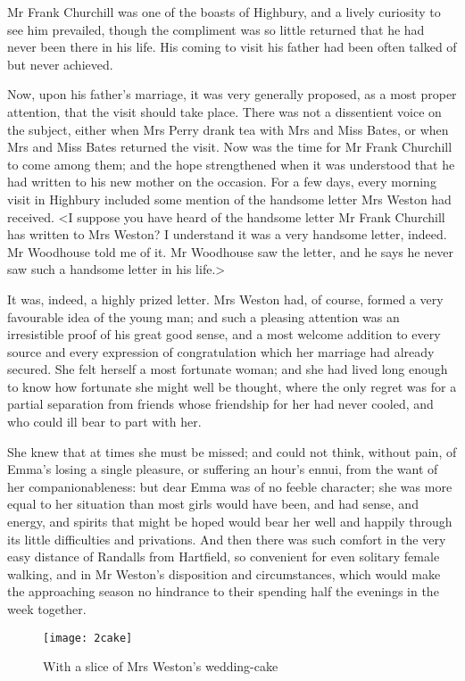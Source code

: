 Mr Frank Churchill was one of the boasts of Highbury, and a lively curiosity to see him prevailed, though the compliment was so little returned that he had never been there in his life. His coming to visit his father had been often talked of but never achieved.

Now, upon his father's marriage, it was very generally proposed, as a most proper attention, that the visit should take place. There was not a dissentient voice on the subject, either when Mrs Perry drank tea with Mrs and Miss Bates, or when Mrs and Miss Bates returned the visit. Now was the time for Mr Frank Churchill to come among them; and the hope strengthened when it was understood that he had written to his new mother on the occasion. For a few days, every morning visit in Highbury included some mention of the handsome letter Mrs Weston had received. <I suppose you have heard of the handsome letter Mr Frank Churchill has written to Mrs Weston? I understand it was a very handsome letter, indeed. Mr Woodhouse told me of it. Mr Woodhouse saw the letter, and he says he never saw such a handsome letter in his life.>

It was, indeed, a highly prized letter. Mrs Weston had, of course, formed a very favourable idea of the young man; and such a pleasing attention was an irresistible proof of his great good sense, and a most welcome addition to every source and every expression of congratulation which her marriage had already secured. She felt herself a most fortunate woman; and she had lived long enough to know how fortunate she might well be thought, where the only regret was for a partial separation from friends whose friendship for her had never cooled, and who could ill bear to part with her.

She knew that at times she must be missed; and could not think, without pain, of Emma's losing a single pleasure, or suffering an hour's ennui, from the want of her companionableness: but dear Emma was of no feeble character; she was more equal to her situation than most girls would have been, and had sense, and energy, and spirits that might be hoped would bear her well and happily through its little difficulties and privations. And then there was such comfort in the very easy distance of Randalls from Hartfield, so convenient for even solitary female walking, and in Mr Weston's disposition and circumstances, which would make the approaching season no hindrance to their spending half the evenings in the week together.

\begin{figure}[tbph]
\centering
\texttt{[image: 2cake]}
\caption{With a slice of Mrs Weston's wedding-cake}
\end{figure}

